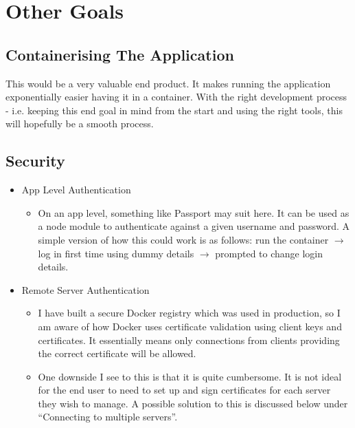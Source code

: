 \documentclass{article}
\begin{document}
\newpage
\section{Other Goals}

\subsection{Containerising The Application}
This would be a very valuable end product. It makes running the application exponentially easier having it in a container. With the right development process - i.e. keeping this end goal in mind from the start and using the right tools, this will hopefully be a smooth process.
\subsection{Security}
\begin{itemize}
	\item App Level Authentication
	\begin{itemize}
		\item On an app level, something like Passport may suit here. It can be used as a node module to authenticate against a given username and password. A simple version of how this could work is as follows: run the container $ \rightarrow $ log in first time using dummy details $ \rightarrow $ prompted to change login details. 
	\end{itemize}
	\item Remote Server Authentication
	\begin{itemize}
		\item I have built a secure Docker registry which was used in production, so I am aware of how Docker uses certificate validation using client keys and certificates. It essentially means only connections from clients providing the correct certificate will be allowed.
		\item One downside I see to this is that it is quite cumbersome. It is not ideal for the end user to need to set up and sign certificates for each server they wish to manage. A possible solution to this is discussed below under ``Connecting to multiple servers''.
	\end{itemize}
\end{itemize}
\end{document}
